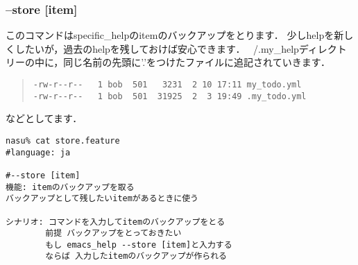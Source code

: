 \subsubsection{--store [item]}
このコマンドはspecific\_helpのitemのバックアップをとります．
少しhelpを新しくしたいが，過去のhelpを残しておけば安心できます．
~/.my\_helpディレクトリーの中に，同じ名前の先頭に'.'をつけたファイルに追記されていきます．
\begin{quote}\begin{verbatim}
-rw-r--r--   1 bob  501   3231  2 10 17:11 my_todo.yml
-rw-r--r--   1 bob  501  31925  2  3 19:49 .my_todo.yml
\end{verbatim}\end{quote}
などとしてます．
\begin{lstlisting}[style=customRuby,basicstyle={\scriptsize\ttfamily}]
nasu% cat store.feature
#language: ja

#--store [item]
機能: itemのバックアップを取る
バックアップとして残したいitemがあるときに使う

シナリオ: コマンドを入力してitemのバックアップをとる
        前提 バックアップをとっておきたい
        もし emacs_help --store [item]と入力する
        ならば 入力したitemのバックアップが作られる
\end{lstlisting}
